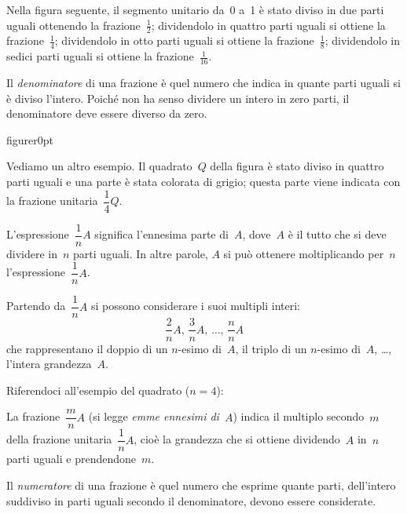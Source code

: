 Nella figura seguente, il segmento unitario da~0 a~1 è stato diviso in due parti uguali ottenendo la frazione~$\frac{1}{2}$;
dividendolo in quattro parti uguali si ottiene la frazione~$\frac{1}{4}$;
dividendolo in otto parti uguali si ottiene la frazione~$\frac{1}{8}$;
dividendolo in sedici parti uguali si ottiene la frazione~$\frac{1}{16}$.

\begin{center}
 
\end{center}


\begin{definizione}
Il \emph{denominatore} di una frazione è quel numero che indica in quante parti uguali si è diviso l'intero.
Poiché non ha senso dividere un intero in zero parti, il denominatore deve essere diverso da zero.
\end{definizione}

\begin{wrapfloat}{figure}{r}{0pt}
 
\end{wrapfloat}

Vediamo un altro esempio. Il quadrato~$Q$ della figura è stato diviso in quattro parti uguali e
una parte è stata colorata di grigio; questa parte viene indicata con la frazione unitaria~$\dfrac{1}{4}Q$.

L'espressione~$\dfrac{1}{n}A$ significa l'ennesima parte di~$A$, dove~$A$ è il tutto che si deve dividere in~$n$ parti uguali.
In altre parole,
$A$ si può ottenere moltiplicando per~$n$ l'espressione~$\dfrac{1}{n}A$.

Partendo da~$\dfrac{1}{n}A$ si possono considerare i suoi multipli interi:
\[\frac{2}{n}A\text{, }\frac{3}{n}A\text{, }\ldots\text{, }\frac{n}{n}A\] che rappresentano il
doppio di un $n$-esimo di~$A$, il triplo di un $n$-esimo di~$A$, \ldots, l'intera grandezza~$A$.

Riferendoci all'esempio del quadrato ($n=4$):
\begin{center}
 
\end{center}

La frazione~$\dfrac{m}{n}A$ (si legge \emph{emme ennesimi di}~$A$) indica il multiplo secondo~$m$
della frazione unitaria~$\dfrac{1}{n}A$, cioè la grandezza che si ottiene dividendo~$A$ in~$n$ parti uguali e prendendone~$m$.

\begin{definizione}
 Il \emph{numeratore} di una frazione è quel numero che esprime quante parti, dell'intero suddiviso
in parti uguali secondo il denominatore, devono essere considerate.
\end{definizione}

